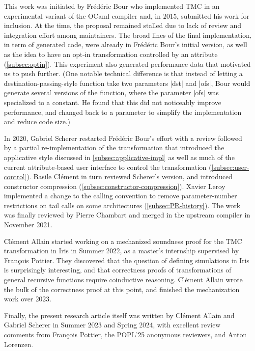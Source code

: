 \begin{acks}
  This work was initiated by Frédéric Bour who implemented TMC in an
  experimental variant of the OCaml compiler and, in 2015, submitted his work
  for inclusion. At the time, the proposal remained stalled due to lack
  of review and integration effort among maintainers. The broad lines
  of the final implementation, in term of generated code, were already
  in Frédéric Bour's initial version, as well as the idea to have an
  opt-in transformation controlled by an attribute
  (\cref{subsec:optin}). This experiment also generated
  performance data that motivated us to push further. (One notable
  technical difference is that instead of letting a destination-passing-style
  function take two parameters \ocaml|dst| and \ocaml|ofs|, Bour
  would generate several versions of the function,
  where the parameter \ocaml|ofs| was specialized to
  a constant. He found that this did not noticeably improve
  performance, and changed back to a parameter to simplify the
  implementation and reduce code size.)

  In 2020, Gabriel Scherer restarted Frédéric Bour's effort with
  a review followed by a partial re-implementation of the
  transformation that introduced the applicative style discussed in
  \cref{subsec:applicative-impl} as well as much of the current
  attribute-based user interface to control the transformation
  (\cref{subsec:user-control}). Basile Clément in turn reviewed
  Scherer's version, and introduced constructor compression
  (\cref{subsec:constructor-compression}). Xavier Leroy implemented
  a change to the \OCaml calling convention to remove parameter-number
  restrictions on tail calls on some architectures
  (\cref{subsec:PR-history}). The work was finally reviewed by Pierre
  Chambart and merged in the upstream \OCaml compiler in November
  2021.

  Clément Allain started working on a mechanized soundness proof for
  the TMC transformation in Iris in Summer 2022, as a master's
  internship supervised by François Pottier. They discovered that the
  question of defining simulations in Iris is surprisingly
  interesting, and that correctness proofs of transformations of
  general recursive functions require coinductive reasoning. Clément
  Allain wrote the bulk of the correctness proof at this point, and
  finished the mechanization work over 2023.

  Finally, the present research article itself was written by Clément
  Allain and Gabriel Scherer in Summer 2023 and Spring 2024, with
  excellent review comments from François Pottier, the POPL'25
  anonymous reviewers, and Anton Lorenzen.
\end{acks}

